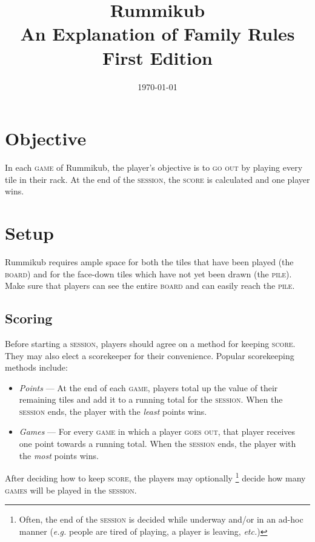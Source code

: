 \documentclass{article}
\begin{document}
\title{\huge Rummikub\\\medskip
\normalsize An Explanation of Family Rules\\
\bigskip
\bigskip
\small First Edition
}
\date{\small\today}

\begin{multicols*}{3}
\maketitle
\section*{Objective}
In each \textsc{game} of Rummikub, the player's objective is to \textsc{go out}
	by playing every tile in their rack. At the end of the \textsc{session},
	the \textsc{score} is calculated and one player wins.

\section*{Setup}

Rummikub requires ample space for both the tiles that have been played (the
	\textsc{board}) and for the face-down tiles which have not yet been
	drawn (the \textsc{pile}). Make sure that players can see the entire
	\textsc{board} and can easily reach the \textsc{pile}.

\subsection*{Scoring}

Before starting a \textsc{session}, players should agree on a method for keeping
	\textsc{score}. They may also elect a scorekeeper for their convenience.
	Popular scorekeeping methods include:
\begin{itemize}
	\item \textit{Points} --- At the end of each \textsc{game}, players
		total up the value of their remaining tiles and add it to a
		running total for the \textsc{session}. When the
		\textsc{session} ends, the player with the \textit{least} points
		wins.
	\item \textit{Games} --- For every \textsc{game} in which a player
		\textsc{goes out}, that player receives one point towards a
		running total. When the \textsc{session} ends, the player with
		the \textit{most} points wins.
\end{itemize}

\noindent After deciding how to keep \textsc{score}, the players may optionally
	\footnote{Often, the end of the \textsc{session} is decided while
	underway and/or in an ad-hoc manner (\textit{e.g.} people are tired of
	playing, a player is leaving, \textit{etc.})} decide how many
	\textsc{games} will be played in the \textsc{session}.


\end{multicols*}
\end{document}
